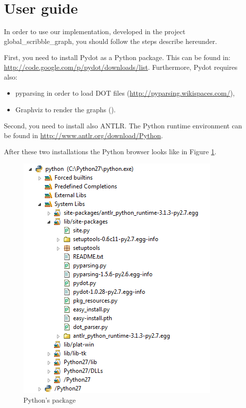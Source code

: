 \documentclass[a4paper,11pt,twoside]{report}
\begin{document}
\section{User guide}
In order to use our implementation, developed in the project global\_scribble\_graph, you should follow the steps describe hereunder.

First, you need to install Pydot as a Python package. This can be found in: \url{http://code.google.com/p/pydot/downloads/list}. Furthermore, Pydot requires also: 
\begin{itemize}
\item pyparsing in order to load DOT files (\url{http://pyparsing.wikispaces.com/}),
\item Graphviz to render the graphs (\cite{graphviz}). 
\end{itemize}

Second, you need to install also ANTLR. The Python runtime environment can be found in \url{ http://www.antlr.org/download/Python}.

After these two installations the Python browser looks like in Figure \ref{fig:pythonpackage}.

\begin{figure}[h]
\begin{center}
\includegraphics{pythonpackage}
\caption{Python's package}
\label{fig:pythonpackage}
\end{center}
\end{figure}
\end{document}
